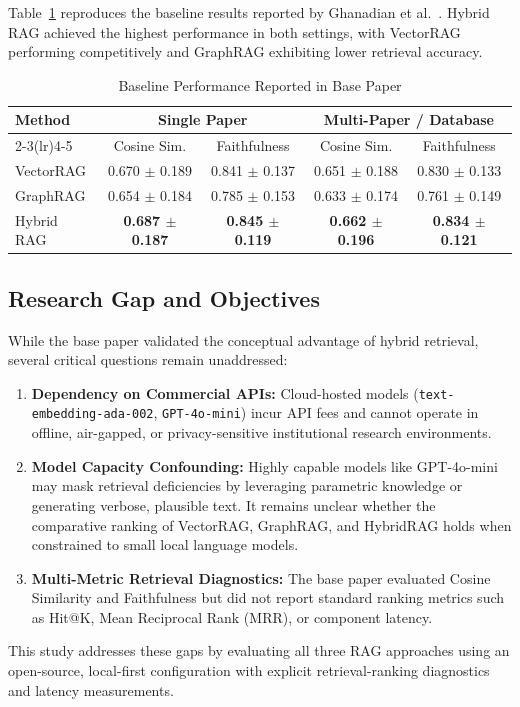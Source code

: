\documentclass[conference]{IEEEtran}
\begin{document}
Table~\ref{tab:baseresults} reproduces the baseline results reported by Ghanadian et al.\ \cite{ghanadian2026base}. Hybrid RAG achieved the highest performance in both settings, with VectorRAG performing competitively and GraphRAG exhibiting lower retrieval accuracy.

\begin{table}[t]
\centering
\caption{Baseline Performance Reported in Base Paper \cite{ghanadian2026base}}
\label{tab:baseresults}
\small
\begin{tabular}{lcccc}
\toprule
\textbf{Method} & \multicolumn{2}{c}{\textbf{Single Paper}} & \multicolumn{2}{c}{\textbf{Multi-Paper / Database}} \\
\cmidrule(lr){2-3}\cmidrule(lr){4-5}
& Cosine Sim. & Faithfulness & Cosine Sim. & Faithfulness \\
\midrule
VectorRAG  & 0.670 $\pm$ 0.189 & 0.841 $\pm$ 0.137 & 0.651 $\pm$ 0.188 & 0.830 $\pm$ 0.133 \\
GraphRAG   & 0.654 $\pm$ 0.184 & 0.785 $\pm$ 0.153 & 0.633 $\pm$ 0.174 & 0.761 $\pm$ 0.149 \\
Hybrid RAG & \textbf{0.687 $\pm$ 0.187} & \textbf{0.845 $\pm$ 0.119} & \textbf{0.662 $\pm$ 0.196} & \textbf{0.834 $\pm$ 0.121} \\
\bottomrule
\end{tabular}
\end{table}

\subsection{Research Gap and Objectives}
While the base paper validated the conceptual advantage of hybrid retrieval, several critical questions remain unaddressed:
\begin{enumerate}
\item \textbf{Dependency on Commercial APIs:} Cloud-hosted models (\texttt{text-embedding-ada-002}, \texttt{GPT-4o-mini}) incur API fees and cannot operate in offline, air-gapped, or privacy-sensitive institutional research environments.
\item \textbf{Model Capacity Confounding:} Highly capable models like GPT-4o-mini may mask retrieval deficiencies by leveraging parametric knowledge or generating verbose, plausible text. It remains unclear whether the comparative ranking of VectorRAG, GraphRAG, and HybridRAG holds when constrained to small local language models.
\item \textbf{Multi-Metric Retrieval Diagnostics:} The base paper evaluated Cosine Similarity and Faithfulness but did not report standard ranking metrics such as Hit@K, Mean Reciprocal Rank (MRR), or component latency.
\end{enumerate}
This study addresses these gaps by evaluating all three RAG approaches using an open-source, local-first configuration with explicit retrieval-ranking diagnostics and latency measurements.
\end{document}

